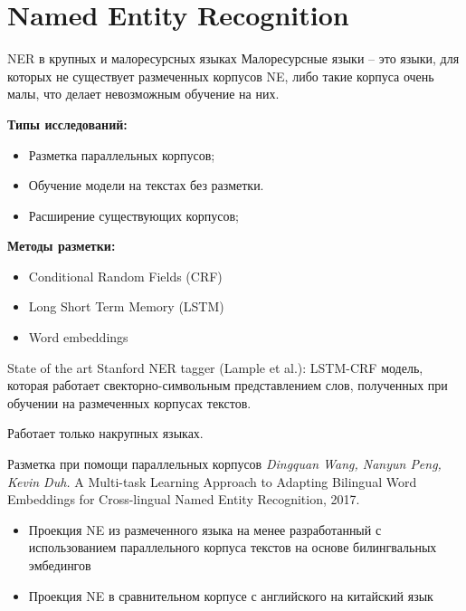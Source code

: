 \documentclass{beamer}
\begin{document}
\section{Named Entity Recognition}

\begin{frame}{NER в крупных и малоресурсных языках}
Малоресурсные языки -- это языки, для которых не существует размеченных корпусов NE, либо  такие корпуса очень малы, что делает невозможным обучение на них.

\textbf{Типы исследований:}
\begin{itemize}
\item Разметка параллельных корпусов;
\item Обучение модели на текстах без разметки. 
\item Расширение существующих корпусов;
\end{itemize}
\textbf{Методы разметки:}
\begin{itemize}
\item Conditional Random Fields (CRF)
\item Long Short Term Memory (LSTM)
\item Word embeddings
\end{itemize}
\end{frame}

\begin{frame}{State of the art}
Stanford NER tagger (Lample et al.): LSTM-CRF модель, которая работает свекторно-символьным представлением слов, полученных при обучении на размеченных корпусах текстов.

Работает только накрупных языках. 

\end{frame}

\begin{frame}{Разметка при помощи параллельных корпусов}
\textit{Dingquan Wang, Nanyun Peng, Kevin Duh.} A Multi-task Learning Approach to Adapting Bilingual Word Embeddings for Cross-lingual Named Entity Recognition, 2017.

\begin{itemize}
\item Проекция NE из размеченного языка на менее разработанный с использованием параллельного корпуса текстов на основе билингвальных эмбедингов
\item Проекция NE в сравнительном корпусе с английского на китайский язык
\end{itemize}
\end{frame}
\end{document}
